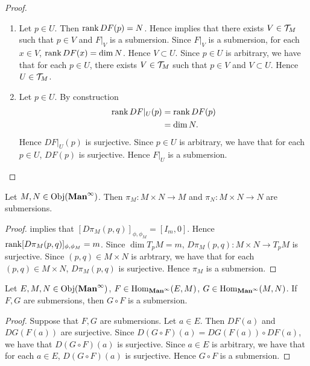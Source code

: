 \documentclass{book}
\begin{document}
	\begin{proof}
		\begin{enumerate}
			\item Let $p \in U$. Then $\operatorname{\text{rank}} DF(p) = N$. Hence  implies that there exists $V \in \mathcal{T}_M$ such that $p \in V$ and $F|_V$ is a submersion. Since $F|_V$ is a submersion, for each $x \in V$, $\operatorname{\text{rank}} DF(x) = \dim N$. Hence $V \subset U$. Since $p \in U$ is arbitrary, we have that for each $p \in U$, there exists $V \in \mathcal{T}_M$ such that $p \in V$ and $V \subset U$. Hence $U \in \mathcal{T}_M$.
			\item Let $p \in U$. By construction  
			\begin{align*}
				\operatorname{\text{rank}} DF|_U(p)
				& = \operatorname{\text{rank}} DF(p) \\ 
				& = \dim N.
			\end{align*}
			Hence $DF|_U(p)$ is surjective. Since $p \in U$ is arbitrary, we have that for each $p \in U$, $DF(p)$ is surjective. Hence $F|_U$ is a submersion.
		\end{enumerate}
	\end{proof}

	\begin{ex} 
		Let $M,N \in \operatorname{Obj}(\operatorname*{\text{\textbf{Man}}^{\infty}})$. Then $\pi_M: M \times N \rightarrow M$ and $\pi_N: M \times N \rightarrow N$ are submersions.
	\end{ex}

	\begin{proof}
		 implies that $[D \pi_M(p,q)]_{\phi, \phi_M} = [I_m, 0]$. Hence $\operatorname{\text{rank}} [D \pi_M(p,q)]_{\phi, \phi_M} = m$. Since $\dim T_p M = m$, $D \pi_M(p,q): M \times N \rightarrow T_p M$ is surjective. Since $(p,q) \in M \times N$ is arbtrary, we have that for each $(p,q) \in M \times N$, $D\pi_M(p,q)$ is surjective. Hence $\pi_M$ is a submersion. 
	\end{proof}
	
	\begin{ex} 
		Let $E, M,N  \in \operatorname{Obj}(\operatorname*{\text{\textbf{Man}}^{\infty}})$,  $F \in \operatorname{Hom}_{\operatorname*{\text{\textbf{Man}}^{\infty}}}(E, M)$, $G \in \operatorname{Hom}_{\operatorname*{\text{\textbf{Man}}^{\infty}}}(M, N)$. If $F, G$ are submersions, then $G \circ F$ is a submersion.
	\end{ex}
	
	\begin{proof}
		Suppose that $F, G$ are submersions. Let $a \in E$. Then $DF(a)$ and $DG(F(a))$ are surjective. Since $D(G \circ F)(a) = DG(F(a)) \circ DF(a)$, we have that $D(G \circ F)(a)$ is surjective. Since $a \in E$ is arbitrary, we have that for each $a \in E$, $D(G \circ F)(a)$ is surjective. Hence $G \circ F$ is a submersion.
	\end{proof}
\end{document}
